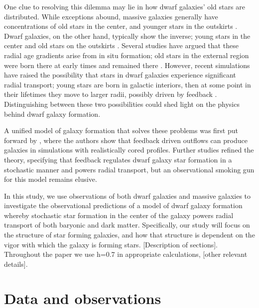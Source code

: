 \documentclass[iop]{emulateapj}
\begin{document}
One clue to resolving this dilemma may lie in how dwarf galaxies' old stars are distributed. While exceptions abound, massive galaxies generally have concentrations of old stars in the center, and younger stars in the outskirts \citep{dejong96,Bakos08}. Dwarf galaxies, on the other hand, typically show the inverse; young stars in the center and old stars on the outskirts \citep{Hidalgo09,Hidalgo13}. Several studies have argued that these radial age gradients arise from in situ formation; old stars in the external region were born there at early times and remained there \citep{Stinson09,Schroyen13}. However, recent simulations have raised the possibility that stars in dwarf galaxies experience significant radial transport; young stars are born in galactic interiors, then at some point in their lifetimes they move to larger radii, possibly driven by feedback \citep{EB17}. Distinguishing between these two possibilities could shed light on the physics behind dwarf galaxy formation.

A unified model of galaxy formation that solves these problems was first put forward by \cite{Governato10}, where the authors show that feedback driven outflows can produce galaxies in simulations with realistically cored profiles. Further studies \citep{Governato12,EB17} refined the theory, specifying that feedback regulates dwarf galaxy star formation in a stochastic manner and powers radial transport, but an observational smoking gun for this model remains elusive. 

In this study, we use observations of both dwarf galaxies and massive galaxies to investigate the observational predictions of a model of dwarf galaxy formation whereby stochastic star formation in the center of the galaxy powers radial transport of both baryonic and dark matter. Specifically, our study will focus on the structure of star forming galaxies, and how that structure is dependent on the vigor with which the galaxy is forming stars. [Description of sections]. Throughout the paper we use h=0.7 in appropriate calculations, [other relevant details]. 

\section{Data and observations}
\label{sec:obs}
\end{document}
